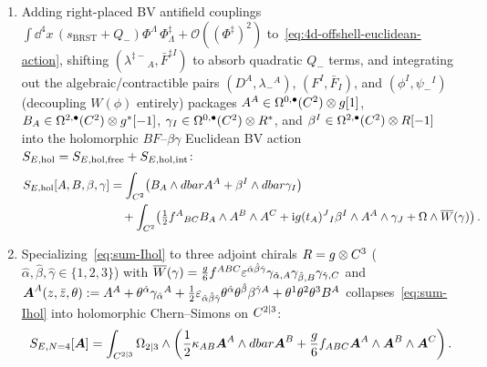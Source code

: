 \begin{proposition}
\label{prop:4d-offshell-twist}
\leavevmode
\begin{enumerate}[label=(\arabic*),leftmargin=*]
  \item Adding right-placed BV antifield couplings $\int\dd^4x\,(s_{\mathrm{BRST}} + Q_-)\Phi^\Lambda\,\Phi^\ddagger_\Lambda + \mathcal{O}((\Phi^\ddagger)^2)$ to~\eqref{eq:4d-offshell-euclidean-action}, shifting $(\lambda^{\ddagger -}{}_A, \bar{F}^{\ddagger I})$ to absorb quadratic $Q_-$ terms, and integrating out the algebraic/contractible pairs $(D^A, \lambda_-{}^A)$, $(F^I, \bar{F}_I)$, and $(\phi^I, \psi_-{}^I)$ (decoupling $W(\phi)$ entirely) packages $A^A \in \Omega^{0,\bullet}(C^2)\otimes g[1]$, $B_A \in \Omega^{2,\bullet}(C^2)\otimes g^*[-1]$, $\gamma_I \in \Omega^{0,\bullet}(C^2)\otimes R^*$, and $\beta^I \in \Omega^{2,\bullet}(C^2)\otimes R[-1]$ into the holomorphic $BF$--$\beta\gamma$ Euclidean BV action $S_{E,\mathrm{hol}} = S_{E,\mathrm{hol,free}} + S_{E,\mathrm{hol,int}}$:
  \begin{equation}
  \label{eq:sum-Ihol}
  \begin{aligned}
  S_{E,\mathrm{hol}}[A,B,\beta,\gamma] &= \int_{C^2}\!\left(B_A\wedge dbarA^A + \beta^I\wedge dbar\gamma_I\right)\\
  &\quad + \int_{C^2}\!\left(\tfrac{1}{2}f^A{}_{BC}B_A\wedge A^B\wedge A^C + \mathrm{i} g(t_A)^J{}_I\beta^I\wedge A^A\wedge\gamma_J + \Omega\wedge\overline{W}(\gamma)\right).
  \end{aligned}
  \end{equation}

  \item Specializing~\eqref{eq:sum-Ihol} to three adjoint chirals $R = g\otimes C^3$ ($\hat{\alpha},\hat{\beta},\hat{\gamma} \in \{1,2,3\}$) with $\overline{W}(\gamma) = \frac{g}{6}f^{ABC}\varepsilon^{\hat{\alpha}\hat{\beta}\hat{\gamma}}\gamma_{\hat{\alpha},A}\gamma_{\hat{\beta},B}\gamma_{\hat{\gamma},C}$ and $\boldsymbol{A}^A(z,\bar{z},\theta) := A^A + \theta^{\hat{\alpha}}\gamma_{\hat{\alpha}}{}^A + \frac{1}{2}\varepsilon_{\hat{\alpha}\hat{\beta}\hat{\gamma}}\theta^{\hat{\alpha}}\theta^{\hat{\beta}}\beta^{\hat{\gamma}A} + \theta^1\theta^2\theta^3B^A$ collapses~\eqref{eq:sum-Ihol} into holomorphic Chern--Simons on $C^{2|3}$:
  \begin{equation}
  \label{eq:n4-super-hcs}
  S_{E,N=4}[\boldsymbol{A}] = \int_{C^{2|3}}\Omega_{2|3}\wedge\left(\frac{1}{2}\kappa_{AB}\boldsymbol{A}^A\wedge dbar\boldsymbol{A}^B + \frac{g}{6}f_{ABC}\boldsymbol{A}^A\wedge\boldsymbol{A}^B\wedge\boldsymbol{A}^C\right).
  \end{equation}
\end{enumerate}
\end{proposition}

